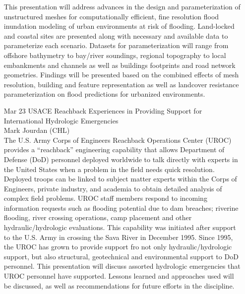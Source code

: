 \documentclass[12]{article}
\begin{document}
\begin{enumerate}
  This presentation will address advances in the design and
  parameterization of unstructured meshes for computationally
  efficient, fine resolution flood inundation modeling of urban
  environments at risk of flooding. Land-locked and coastal sites are
  presented along with necessary and available data to parameterize
  each scenario. Datasets for parameterization will range from
  offshore bathymetry to bay/river soundings, regional topography to
  local embankments and channels as well as buildings footprints and
  road network geometries. Findings will be presented based on the
  combined effects of mesh resolution, building and feature
  representation as well as landcover resistance parameterization on
  flood predictions for urbanized environments.

\item[Mar 23]USACE Reachback Experiences in Providing Support for International Hydrologic Emergencies\\ Mark Jourdan (CHL) \\
  The U.S. Army Corps of Engineers Reachback Operations Center (UROC)
  provides a ``reachback'' engineering capability that allows
  Department of Defense (DoD) personnel deployed worldwide to talk
  directly with experts in the United States when a problem in the
  field needs quick resolution. Deployed troops can be linked to
  subject matter experts within the Corps of Engineers, private
  industry, and academia to obtain detailed analysis of complex field
  problems. UROC staff members respond to incoming information
  requests such as flooding potential due to dam breaches; riverine
  flooding, river crossing operations, camp placement and other
  hydraulic/hydrologic evaluations.  This capability was initiated
  after support to the U.S. Army in crossing the Sava River in
  December 1995.  Since 1995, the UROC has grown to provide support
  fro not only hydraulic/hydrologic support, but also structural,
  geotechnical and environmental support to DoD personnel.  This
  presentation will discuss assorted hydrologic emergencies that UROC
  personnel have supported.  Lessons learned and approaches used will
  be discussed, as well as recommendations for future efforts in the
  discipline.


\end{enumerate}
\end{document}
